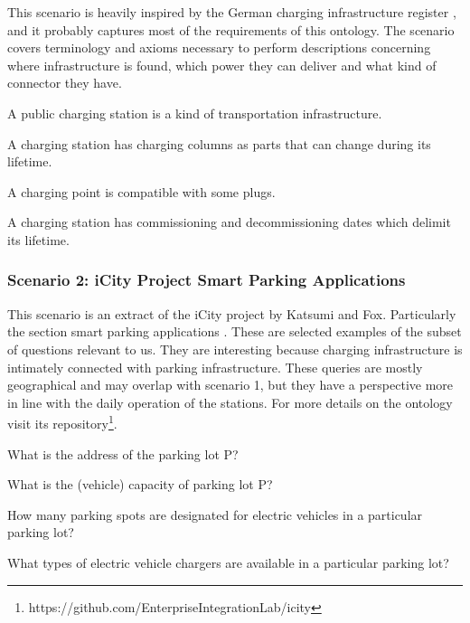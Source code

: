 This scenario is heavily inspired by the German charging infrastructure register
\cite{Bundesnetzagentur.27Oct2023}, and it probably captures most of the
requirements of this ontology. The scenario covers terminology and axioms
necessary to perform descriptions concerning where infrastructure is found,
which power they can deliver and what kind of connector they have.

\begin{namedbreak}
    A public charging station is a kind of transportation infrastructure.
\end{namedbreak}
\begin{namedbreak}\label{CQ1.1}
    A charging station has charging columns as parts that can change during its lifetime.
\end{namedbreak}
\begin{namedbreak}
    A charging point is compatible with some plugs.
\end{namedbreak}
\begin{namedbreak}
    A charging station has commissioning and decommissioning dates which delimit its lifetime.
\end{namedbreak}

\subsubsection*{Scenario 2: iCity Project Smart Parking Applications}

This scenario is an extract of the iCity project by Katsumi and Fox.
Particularly the section smart parking applications \cite{Katsumi.2020}. These
are selected examples of the subset of questions relevant to us. They are
interesting because charging infrastructure is intimately connected with parking
infrastructure. These queries are mostly geographical and may overlap with
scenario 1, but they have a perspective more in line with the daily operation of
the stations. For more details on the ontology visit its
repository\footnote{https://github.com/EnterpriseIntegrationLab/icity}.


\begin{namedbreak}\label{CQ2.0}
    What is the address of the parking lot P?
\end{namedbreak}
\begin{namedbreak}\label{CQ2.1}
    What is the (vehicle) capacity of parking lot P?
\end{namedbreak}
\begin{namedbreak}
    How many parking spots are designated for electric vehicles in a particular
    parking lot?
\end{namedbreak}
\begin{namedbreak}
    What types of electric vehicle chargers are available in a particular
    parking lot?
\end{namedbreak}